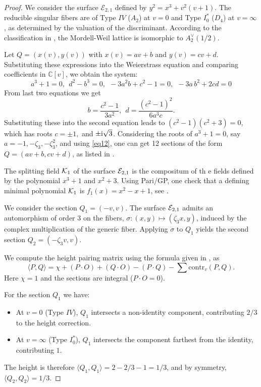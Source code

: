 \documentclass[11pt]{amsart}
\begin{document}
\begin{proof}
	We consider the surface $\mathcal{E}_{2,1}$ defined by $y^2 = x^3 + v^2 (v+1)$. The reducible singular fibers are of Type $IV$ ($A_2$) at $v=0$ and Type $I_0^*$ ($D_4$) at $v=\infty$, as determined by the valuation of the discriminant. According to the classification in \cite[Table 8.2, No. 32]{Schuett2019}, the Mordell-Weil lattice is isomorphic to $A_2^\vee(1/2)$.
	
	
	Let  $Q = (x(v), y(v))$ with $x(v) = a v + b$ and $y(v) = c v + d$. Substituting these expressions into the Weierstrass equation  and
	comparing coefficients in $\mathbb{C}[v]$, we obtain the system:
	\begin{equation*}
		a^3  +1= 0,  \ \ 	d^{2}-b^{3}=0, \ \ 
		-3 a^{2} b +c^{2}-1=0, \ \
		-3 a \,b^{2}+2 c d =0 
	\end{equation*}
From last two equations we get
\begin{equation}
	\label{eq12}
	b=\frac{c^{2}-1}{3 a^{2}}, \ \ d= \frac{\left(c^{2}-1\right)^{2}}{6 a^{3} c}.	\end{equation}	
	Substituting these into the second equation leads to 
	$(c^2-1)(c^2+3)=0$, which has roots
	$c=\pm 1, $ and $\pm {\rm{i}} \sqrt{3}$.	
 Considering  the roots of $a^3+1=0$, say $a=-1, -\zeta_3, -\zeta_3^2$, and 
 using \ref{eq12}, one can get 12 sections of the form $Q = (  a v + b,  c v + d)$, as listed in \cite[check1]{Shioda360-Codes}.


The splitting field ${\mathcal K}_1$ of  the surface ${\mathcal E}_{2,1}$ is the compositum of th e fields defined by the polynomial $x^3+1$ and $x^2+3$. Using Pari/GP,   one check that  a defining minimal polynomial ${\mathcal K}_1$ is
$f_1(x)= x^2-x+1$, 
see \cite[Gp360]{Shioda360-Codes}.

We consider the section $Q_1 = (-v, v)$. The surface ${\mathcal E}_{2,1}$ admits an automorphism of order 3 on the fibers, $\sigma: (x, y) \mapsto (\zeta_3 x, y)$, induced by the complex multiplication of the generic fiber. Applying $\sigma$ to $Q_1$ yields the second section $Q_2 = (-\zeta_3 v, v)$.
	
	We compute the height pairing matrix using the formula given in  \cite[Thm. 6.24]{Schuett2019}, as
	 $$\langle P, Q \rangle = \chi + (P \cdot O) + (Q \cdot O) - (P \cdot Q) - \sum \text{contr}_v(P, Q).$$ Here $\chi=1$ and the sections are integral ($P \cdot O = 0$).
	
	For the section $Q_1$ we have:
	\begin{itemize}
		\item At $v=0$ (Type $IV$), $Q_1$ intersects a non-identity component, contributing $2/3$ to the height correction.
		\item At $v=\infty$ (Type $I_0^*$), $Q_1$ intersects the component farthest from the identity, contributing $1$.
	\end{itemize}
	The height is therefore $\langle Q_1, Q_1 \rangle = 2 - 2/3 - 1 = 1/3$, and  by symmetry, $\langle Q_2, Q_2 \rangle = 1/3$.
	

\end{proof}
\end{document}
